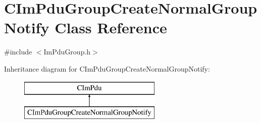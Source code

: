 \hypertarget{class_c_im_pdu_group_create_normal_group_notify}{}\section{C\+Im\+Pdu\+Group\+Create\+Normal\+Group\+Notify Class Reference}
\label{class_c_im_pdu_group_create_normal_group_notify}


{\ttfamily \#include $<$Im\+Pdu\+Group.\+h$>$}

Inheritance diagram for C\+Im\+Pdu\+Group\+Create\+Normal\+Group\+Notify\+:\begin{figure}[H]
\begin{center}
\leavevmode
\includegraphics[height=2.000000cm]{class_c_im_pdu_group_create_normal_group_notify}
\end{center}
\end{figure}
